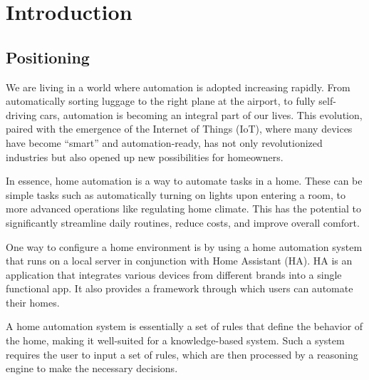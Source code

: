 \documentclass[11pt,a4paper]{report}
\begin{document}



\chapter{Introduction}
\section{Positioning}
We are living in a world where automation is adopted increasing rapidly. From automatically sorting luggage to the right plane at the airport, to fully self-driving cars, automation is becoming an integral part of our lives. This evolution, paired with the emergence of the Internet of Things (IoT), where many devices have become ``smart'' and automation-ready, has not only revolutionized industries but also opened up new possibilities for homeowners.

In essence, home automation is a way to automate tasks in a home. These can be simple tasks such as automatically turning on lights upon entering a room, to more advanced operations like regulating home climate. This has the potential to significantly streamline daily routines, reduce costs, and improve overall comfort.

One way to configure a home environment is by using a home automation system that runs on a local server in conjunction with Home Assistant (HA). HA is an application that integrates various devices from different brands into a single functional app. It also provides a framework through which users can automate their homes.

A home automation system is essentially a set of rules that define the behavior of the home, making it well-suited for a knowledge-based system. Such a system requires the user to input a set of rules, which are then processed by a reasoning engine to make the necessary decisions.
\end{document}

